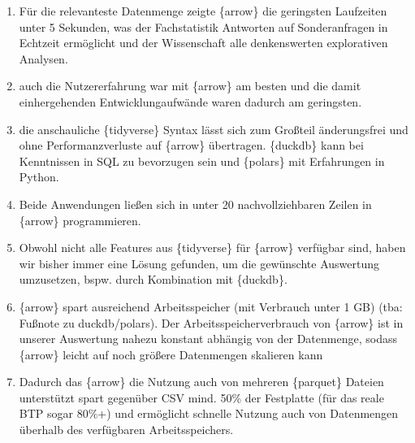 \documentclass[
  german,
  10pt,
  twoside]{article}
\providecommand{\tightlist}{%
  \setlength{\itemsep}{0pt}\setlength{\parskip}{0pt}}
\begin{document}
\begin{enumerate}
\def\labelenumi{\arabic{enumi}.}
\tightlist
\item
  Für die relevanteste Datenmenge zeigte \{arrow\} die geringsten
  Laufzeiten unter 5 Sekunden, was der Fachstatistik Antworten auf
  Sonderanfragen in Echtzeit ermöglicht und der Wissenschaft alle
  denkenswerten explorativen Analysen.
\item
  auch die Nutzererfahrung war mit \{arrow\} am besten und die damit
  einhergehenden Entwicklungaufwände waren dadurch am geringsten.
\item
  die anschauliche \{tidyverse\} Syntax lässt sich zum Großteil
  änderungsfrei und ohne Performanzverluste auf \{arrow\} übertragen.
  \{duckdb\} kann bei Kenntnissen in SQL zu bevorzugen sein und
  \{polars\} mit Erfahrungen in Python.
\item
  Beide Anwendungen ließen sich in unter 20 nachvollziehbaren Zeilen in
  \{arrow\} programmieren.
\item
  Obwohl nicht alle Features aus \{tidyverse\} für \{arrow\} verfügbar
  sind, haben wir bisher immer eine Lösung gefunden, um die gewünschte
  Auswertung umzusetzen, bspw. durch Kombination mit \{duckdb\}.
\item
  \{arrow\} spart ausreichend Arbeitsspeicher (mit Verbrauch unter 1 GB)
  (tba: Fußnote zu duckdb/polars). Der Arbeitsspeicherverbrauch von
  \{arrow\} ist in unserer Auswertung nahezu konstant abhängig von der
  Datenmenge, sodass \{arrow\} leicht auf noch größere Datenmengen
  skalieren kann
\item
  Dadurch das \{arrow\} die Nutzung auch von mehreren \{parquet\}
  Dateien unterstützt spart gegenüber CSV mind. 50\% der Festplatte (für
  das reale BTP sogar 80\%+) und ermöglicht schnelle Nutzung auch von
  Datenmengen überhalb des verfügbaren Arbeitsspeichers.
\end{enumerate}
\end{document}

